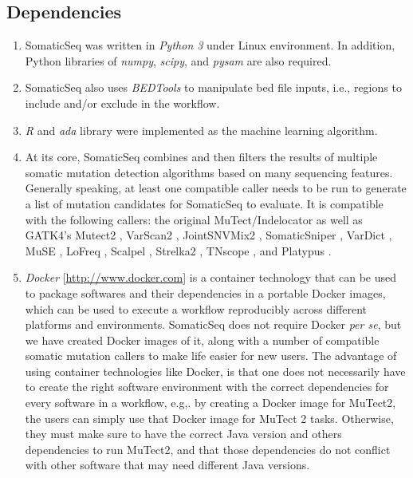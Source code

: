 \documentclass[10pt,letterpaper]{article}
\begin{document}
\begin{sloppypar}
\subsection{Dependencies}

\begin{enumerate}

    \item
    SomaticSeq was written in \emph{Python 3} under Linux environment. In addition, Python libraries of \emph{numpy}, \emph{scipy}, and \emph{pysam} are also required. 

    \item
    SomaticSeq also uses \emph{BEDTools} \cite{bedtools} to manipulate bed file inputs, i.e., regions to include and/or exclude in the workflow. 

    \item
    \emph{R} and \emph{ada} library were implemented as the machine learning algorithm. 

    \item
    At its core, SomaticSeq combines and then filters the results of multiple somatic mutation detection algorithms based on many sequencing features. Generally speaking, at least one compatible caller needs to be run to generate a list of mutation candidates for SomaticSeq to evaluate. It is compatible with the following callers: the original MuTect/Indelocator as well as GATK4's Mutect2 \cite{mutect}, VarScan2 \cite{varscan2}, JointSNVMix2 \cite{jointsnvmix2}, SomaticSniper \cite{somaticsniper}, VarDict \cite{vardict}, MuSE \cite{muse}, LoFreq \cite{lofreq}, Scalpel \cite{scalpel}, Strelka2 \cite{strelka2}, TNscope \cite{tnscope}, and Platypus \cite{platypus}.  
    
    \item
    \emph{Docker} [\href{http://www.docker.com}{http://www.docker.com}] is a container technology that can be used to package softwares and their dependencies in a portable Docker images, which can be used to execute a workflow reproducibly across different platforms and environments. SomaticSeq does not require Docker \textit{per se}, but we have created Docker images of it, along with a number of compatible somatic mutation callers to make life easier for new users. The advantage of using container technologies like Docker, is that one does not necessarily have to create the right software environment with the correct dependencies for every software in a workflow, e.g,. by creating a Docker image for MuTect2, the users can simply use that Docker image for MuTect 2 tasks. Otherwise, they must make sure to have the correct Java version and others dependencies to run MuTect2, and that those dependencies do not conflict with other software that may need different Java versions. 


\end{enumerate}
\end{sloppypar}
\end{document}
